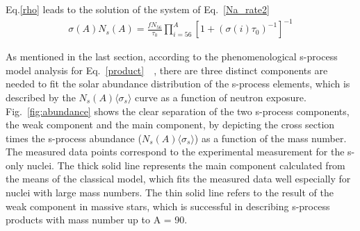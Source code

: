 Eq.\ref{rho}  leads to the  solution of the system of Eq.~\ref{Na_rate2}
 \begin{equation}
    \label{product}
    \begin{aligned}
    \sigma(A)N_s(A) = \frac{f N_{56}}{\tau_0} \prod^A_{i=56}[1+(\sigma(i)\tau_0)^{-1}]^{-1}
    \end{aligned}
\end{equation}

As mentioned in the last section, according to the phenomenological s-process model analysis for Eq.~\ref{product}~\citep{Kappeler1989}~\citep{CLAYTON1961}, there are three distinct components are needed to  fit the solar abundance distribution of the s-process elements, which is described by the $N_{s}(A) \langle \sigma_s \rangle $ curve as a function of neutron exposure. Fig.~\ref{fig:abundance} shows the clear separation of the two s-process components, the weak component and the main component, by depicting the cross section times the s-process abundance ($N_{s}(A) \langle \sigma_s \rangle $) as a function of the mass number. The measured data points correspond to the experimental measurement for the s-only nuclei. The thick solid line represents the  main component calculated from the means of the classical model, which fits the measured data well especially for nuclei with large mass numbers. The thin solid line refers to the result of the weak component in  massive stars, which is successful in describing s-process products with mass number up to A = 90.




